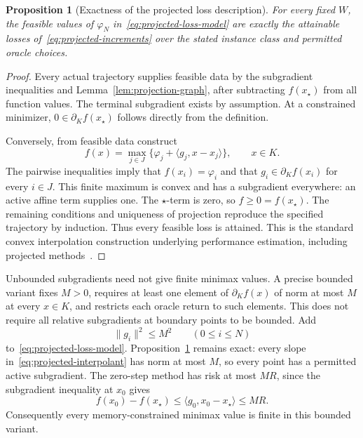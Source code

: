 \documentclass[11pt]{article}
\numberwithin{equation}{section}
\newtheorem{proposition}[theorem]{Proposition}
\theoremstyle{definition}
\begin{document}
\begin{proposition}[Exactness of the projected loss description]\label{prop:projected-loss}
For every fixed $W$, the feasible values of $\varphi_N$ in~\eqref{eq:projected-loss-model} are exactly the attainable losses of~\eqref{eq:projected-increments} over the stated instance class and permitted oracle choices.
\end{proposition}
\begin{proof}
Every actual trajectory supplies feasible data by the subgradient inequalities and Lemma~\ref{lem:projection-graph}, after subtracting $f(x_\star)$ from all function values. The terminal subgradient exists by assumption. At a constrained minimizer, $0\in\partial_K f(x_\star)$ follows directly from the definition.

Conversely, from feasible data construct
\begin{equation}
 f(x)=\max_{j\in J}
       \{\varphi_j+\langle g_j,x-x_j\rangle\},\qquad x\in K.
 \label{eq:projected-interpolant}
\end{equation}
The pairwise inequalities imply that $f(x_i)=\varphi_i$ and that $g_i\in\partial_K f(x_i)$ for every $i\in J$. This finite maximum is convex and has a subgradient everywhere: an active affine term supplies one. The $\star$-term is zero, so $f\ge0=f(x_\star)$. The remaining conditions and uniqueness of projection reproduce the specified trajectory by induction. Thus every feasible loss is attained. This is the standard convex interpolation construction underlying performance estimation, including projected methods~\cite{THGcomp}.
\end{proof}

Unbounded subgradients need not give finite minimax values. A precise bounded variant fixes $M>0$, requires at least one element of $\partial_K f(x)$ of norm at most $M$ at every $x\in K$, and restricts each oracle return to such elements. This does not require all relative subgradients at boundary points to be bounded. Add
\begin{equation}
 \|g_i\|^2\le M^2\qquad(0\le i\le N)
 \label{eq:bounded-projected-subgradients}
\end{equation}
to~\eqref{eq:projected-loss-model}. Proposition~\ref{prop:projected-loss} remains exact: every slope in~\eqref{eq:projected-interpolant} has norm at most $M$, so every point has a permitted active subgradient. The zero-step method has risk at most $MR$, since the subgradient inequality at $x_0$ gives
\[
 f(x_0)-f(x_\star)
 \le\langle g_0,x_0-x_\star\rangle\le MR.
\]
Consequently every memory-constrained minimax value is finite in this bounded variant.
\end{document}
